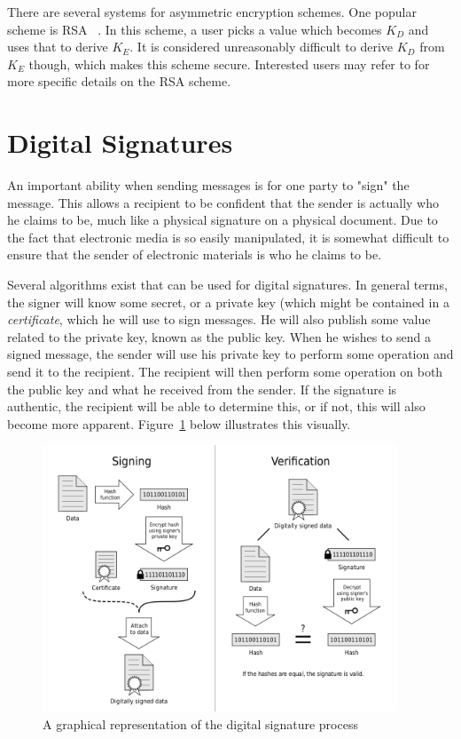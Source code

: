 There are several systems for asymmetric encryption schemes. One popular scheme is RSA ~\cite{RSA}. In this scheme, a user picks a value which becomes
$K_D$ and uses that to derive $K_E$. It is considered unreasonably difficult to derive $K_D$ from $K_E$ though, which makes this scheme secure.
Interested users may refer to \cite{RSA} for more specific details on the RSA scheme.


\section{Digital Signatures}
An important ability when sending messages is for one party to "sign" the message. This
allows a recipient to be confident that the sender is actually who he claims to be, much
like a physical signature on a physical document. Due to the fact that electronic media
is so easily manipulated, it is somewhat difficult to ensure that the sender of electronic
materials is who he claims to be.

Several algorithms exist that can be used for digital signatures. In general terms, the signer
will know some secret, or a private key (which might be contained in a \textit{certificate},
 which he will use to sign messages. He will
also publish some value related to the private key, known as the public key. When he wishes
to send a signed message, the sender will use his private key to perform some operation
and send it to the recipient. The recipient will then perform some operation on both
the public key and what he received from the sender. If the signature is authentic, the
recipient will be able to determine this, or if not, this will also become more apparent.
Figure~\ref{fig:signing} below illustrates this visually.

\begin{figure}[!ht]
\includegraphics[width=400px]{images/signing.png}
\caption{A graphical representation of the digital signature process \cite{signing}}
\label{fig:signing}
\end{figure}


